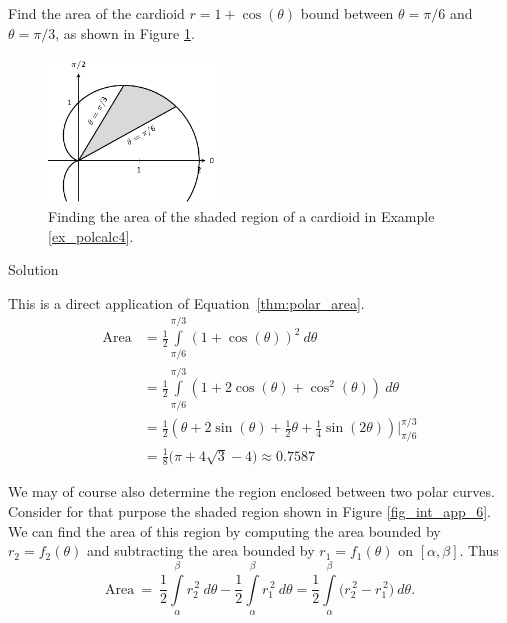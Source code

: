 \begin{example}\label{ex_polcalc4}
Find the area of the cardioid $r=1+\cos(\theta)$ bound between $\theta=\pi/6$ and $\theta=\pi/3$, as shown in Figure \ref{fig_int_app_5}.

\begin{figure}[H]
	\begin{center}
			\includegraphics[width=0.4\textwidth]{fig_int_app_5}
	\caption{Finding the area of the shaded region of a cardioid in Example \ref{ex_polcalc4}.}
	\label{fig_int_app_5}
	\end{center}
\end{figure}

Solution 

This is a direct application of Equation~\eqref{thm:polar_area}. 
\allowdisplaybreaks
\begin{align*}
\text{Area} &= \frac12\int\limits_{\pi/6}^{\pi/3} (1+\cos(\theta))^2\ d\theta\\[0.2cm]
				&= \frac12\int\limits_{\pi/6}^{\pi/3} (1+2\cos(\theta)+\cos^2(\theta))\ d\theta\\[0.2cm]
				&= \frac12\left(\theta+2\sin(\theta)+\frac12\theta+\frac14\sin(2\theta)\right)\Bigg|_{\pi/6}^{\pi/3} \\[0.2cm]
				&= \frac18\big(\pi+4\sqrt{3}-4\big) \approx 0.7587
				\end{align*}
				



\end{example}


We may of course also determine the region enclosed between two polar curves. Consider for that purpose the shaded region shown in Figure \ref{fig_int_app_6}. We can find the area of this region by computing the area bounded by $r_2=f_2(\theta)$ and subtracting the area bounded by $r_1=f_1(\theta)$ on $[\alpha,\beta]$. Thus
\begin{equation}
\text{Area}\ = \ \frac12\int\limits_\alpha^\beta r_2^{\,2}\ d\theta - \frac12\int\limits_\alpha^\beta r_1^{\,2}\ d\theta = \frac12\int\limits_\alpha^\beta \big(r_2^{\,2}-r_1^{\,2}\big)\ d\theta.
\label{idea:area_between_polar}
\end{equation}

